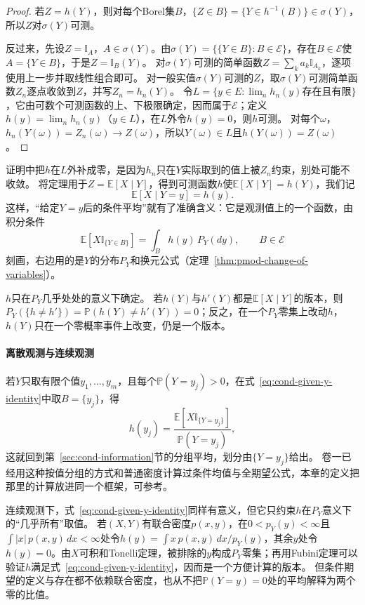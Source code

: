 \begin{proof}
若$Z=h(Y)$，则对每个Borel集$B$，$\{Z\in B\}=\{Y\in h^{-1}(B)\}\in\sigma(Y)$，所以$Z$对$\sigma(Y)$可测。

反过来，先设$Z=\mathbb I_A$，$A\in\sigma(Y)$。由$\sigma(Y)=\{\{Y\in B\}:B\in\mathcal E\}$，存在$B\in\mathcal E$使$A=\{Y\in B\}$，于是$Z=\mathbb I_B(Y)$。
对$\sigma(Y)$可测的简单函数$Z=\sum_ka_k\mathbb I_{A_k}$，逐项使用上一步并取线性组合即可。
对一般实值$\sigma(Y)$可测的$Z$，取$\sigma(Y)$可测简单函数$Z_n$逐点收敛到$Z$，并写$Z_n=h_n(Y)$。
令$L=\{y\in E:\lim_nh_n(y)\text{存在且有限}\}$，它由可数个可测函数的上、下极限确定，因而属于$\mathcal E$；定义$h(y)=\lim_nh_n(y)$（$y\in L$），在$L$外令$h(y)=0$，则$h$可测。
对每个$\omega$，$h_n(Y(\omega))=Z_n(\omega)\to Z(\omega)$，所以$Y(\omega)\in L$且$h(Y(\omega))=Z(\omega)$。
\end{proof}

证明中把$h$在$L$外补成零，是因为$h_n$只在$Y$实际取到的值上被$Z_n$约束，别处可能不收敛。
将定理用于$Z=\mathbb E[X\mid Y]$，得到可测函数$h$使$\mathbb E[X\mid Y]=h(Y)$，我们记
\[
  \mathbb E[X\mid Y=y]=h(y).
\]
这样，“给定$Y=y$后的条件平均”就有了准确含义：它是观测值上的一个函数，由积分条件
\begin{equation}
  \mathbb E[X\mathbb I_{\{Y\in B\}}]=\int_Bh(y)\,P_Y(dy),\qquad B\in\mathcal E
  \label{eq:cond-given-y-identity}
\end{equation}
刻画，右边用的是$Y$的分布$P_Y$和换元公式（定理~\ref{thm:pmod-change-of-variables}）。

$h$只在$P_Y$几乎处处的意义下确定。
若$h(Y)$与$h'(Y)$都是$\mathbb E[X\mid Y]$的版本，则$P_Y(\{h\neq h'\})=\mathbb P(h(Y)\neq h'(Y))=0$；反之，在一个$P_Y$零集上改动$h$，$h(Y)$只在一个零概率事件上改变，仍是一个版本。

\paragraph{离散观测与连续观测}
若$Y$只取有限个值$y_1,\ldots,y_m$，且每个$\mathbb P(Y=y_j)>0$，在式~\eqref{eq:cond-given-y-identity}中取$B=\{y_j\}$，得
\[
  h(y_j)=\frac{\mathbb E[X\mathbb I_{\{Y=y_j\}}]}{\mathbb P(Y=y_j)},
\]
这就回到第~\ref{sec:cond-information}节的分组平均，划分由$\{Y=y_j\}$给出。
卷一已经用这种按值分组的方式和普通密度计算过条件均值与全期望公式，本章的定义把那里的计算放进同一个框架，可参考。

连续观测下，式~\eqref{eq:cond-given-y-identity}同样有意义，但它只约束$h$在$P_Y$意义下的“几乎所有”取值。
若$(X,Y)$有联合密度$p(x,y)$，在$0<p_Y(y)<\infty$且$\int|x|\,p(x,y)\,dx<\infty$处令$h(y)=\int x\,p(x,y)\,dx/p_Y(y)$，其余$y$处令$h(y)=0$。由$X$可积和Tonelli定理，被排除的$y$构成$P_Y$零集；再用Fubini定理可以验证$h$满足式~\eqref{eq:cond-given-y-identity}，因而是一个方便计算的版本。
但条件期望的定义与存在都不依赖联合密度，也从不把$\mathbb P(Y=y)=0$处的平均解释为两个零的比值。

